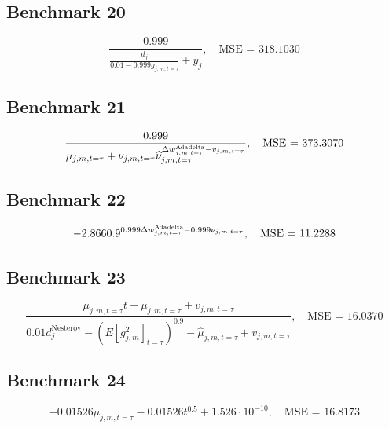\subsection*{Benchmark 20}
\begin{equation}
\label{eq:benchmark-20}
\frac{0.999}{\frac{d_{j}}{0.01 - 0.999 g_{j, m, t=\tau}} + y_{j}}, \quad \text{MSE = } 318.1030
\end{equation}


\subsection*{Benchmark 21}
\begin{equation}
\label{eq:benchmark-21}
\frac{0.999}{\mu_{j,m,t=\tau} + \nu_{j,m,t=\tau} \widehat{\nu}_{j,m,t=\tau}^{\Delta w^{\text{A}\hspace{-.018cm}\text{dadelta}}_{j, m, t=\tau} - v_{j, m, t=\tau}}}, \quad \text{MSE = } 373.3070
\end{equation}


\subsection*{Benchmark 22}
\begin{equation}
\label{eq:benchmark-22}
- 2.866 {0.9}^{0.999 \Delta w^{\text{A}\hspace{-.018cm}\text{dadelta}}_{j, m, t=\tau} - 0.999 \nu_{j,m,t=\tau}}, \quad \text{MSE = } 11.2288
\end{equation}


\subsection*{Benchmark 23}
\begin{equation}
\label{eq:benchmark-23}
\frac{\mu_{j,m,t=\tau} t + \mu_{j,m,t=\tau} + v_{j, m, t=\tau}}{0.01 d_{j}^{\mathrm{Nesterov}} - \left(E\left[g_{j, m}^2\right]_{t=\tau}\right)^{0.9} - \widehat{\mu}_{j,m,t=\tau} + v_{j, m, t=\tau}}, \quad \text{MSE = } 16.0370
\end{equation}


\subsection*{Benchmark 24}
\begin{equation}
\label{eq:benchmark-24}
- 0.01526 \mu_{j,m,t=\tau} - 0.01526 t^{0.5} + 1.526 \cdot 10^{-10}, \quad \text{MSE = } 16.8173
\end{equation}


